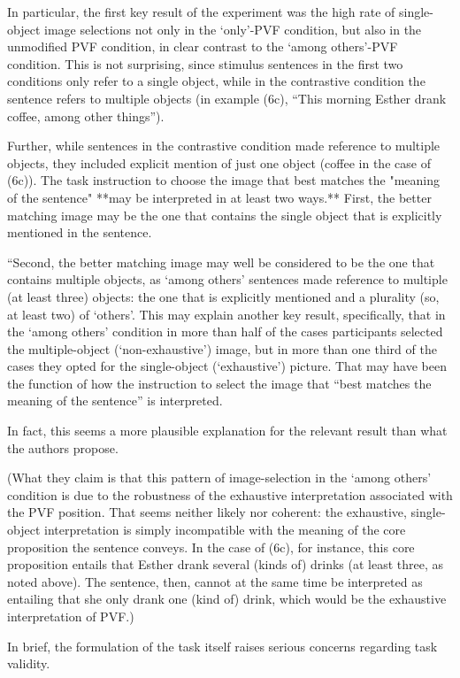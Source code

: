 \documentclass[a4paper, ruler]{CUP-JNL-LIN}%
\begin{document}
In particular, the first key result of the experiment was the high rate of single-object image selections not only in the ‘only’-PVF condition, but also in the unmodified PVF condition, in clear contrast to the ‘among others’-PVF condition. This is not surprising, since stimulus sentences in the first two conditions only refer to a single object, while in the contrastive condition the sentence refers to multiple objects (in example (6c), “This morning Esther drank coffee, among other things”).

Further, while sentences in the contrastive condition made reference to multiple objects, they included explicit mention of just one object (coffee in the case of (6c)). The task instruction to choose the image that best matches the "meaning of the sentence" **may be interpreted in at least two ways.** First, the better matching image may be the one that contains the single object that is explicitly mentioned in the sentence.

“Second, the better matching image may well be considered to be the one that contains multiple objects, as ‘among others’ sentences made reference to multiple (at least three) objects: the one that is explicitly mentioned and a plurality (so, at least two) of ‘others’. This may explain another key result, specifically, that in the ‘among others’ condition in more than half of the cases participants selected the multiple-object (‘non-exhaustive’) image, but in more than one third of the cases they opted for the single-object (‘exhaustive’) picture. That may have been the function of how the instruction to select the image that “best matches the meaning of the sentence” is interpreted.

In fact, this seems a more plausible explanation for the relevant result than what the authors propose.

(What they claim is that this pattern of image-selection in the ‘among others’ condition is due to the robustness of the exhaustive interpretation associated with the PVF position. That seems neither likely nor coherent: the exhaustive, single-object interpretation is simply incompatible with the meaning of the core proposition the sentence conveys. In the case of (6c), for instance, this core proposition entails that Esther drank several (kinds of) drinks (at least three, as noted above). The sentence, then, cannot at the same time be interpreted as entailing that she only drank one (kind of) drink, which would be the exhaustive interpretation of PVF.)

In brief, the formulation of the task itself raises serious concerns regarding task validity.
\end{document}
